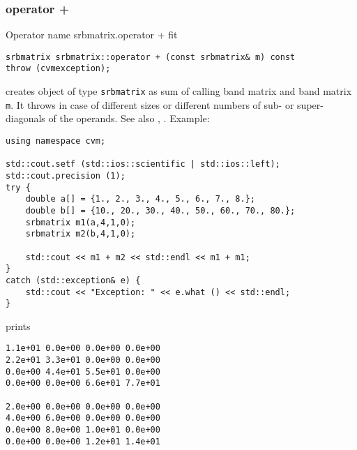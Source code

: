 \subsubsection{operator +}
Operator%
\pdfdest name {srbmatrix.operator +} fit
\begin{verbatim}
srbmatrix srbmatrix::operator + (const srbmatrix& m) const
throw (cvmexception);
\end{verbatim}
creates  object of type \verb"srbmatrix" as  sum of
 calling band matrix and  band matrix \verb"m".
It throws  
in case of different sizes or different numbers of sub- or super-diagonals
of the operands.
See also , .
Example:
\begin{Verbatim}
using namespace cvm;

std::cout.setf (std::ios::scientific | std::ios::left); 
std::cout.precision (1);
try {
    double a[] = {1., 2., 3., 4., 5., 6., 7., 8.};
    double b[] = {10., 20., 30., 40., 50., 60., 70., 80.};
    srbmatrix m1(a,4,1,0);
    srbmatrix m2(b,4,1,0);

    std::cout << m1 + m2 << std::endl << m1 + m1;
}
catch (std::exception& e) {
    std::cout << "Exception: " << e.what () << std::endl;
}
\end{Verbatim}
prints
\begin{Verbatim}
1.1e+01 0.0e+00 0.0e+00 0.0e+00
2.2e+01 3.3e+01 0.0e+00 0.0e+00
0.0e+00 4.4e+01 5.5e+01 0.0e+00
0.0e+00 0.0e+00 6.6e+01 7.7e+01

2.0e+00 0.0e+00 0.0e+00 0.0e+00
4.0e+00 6.0e+00 0.0e+00 0.0e+00
0.0e+00 8.0e+00 1.0e+01 0.0e+00
0.0e+00 0.0e+00 1.2e+01 1.4e+01
\end{Verbatim}
\newpage





